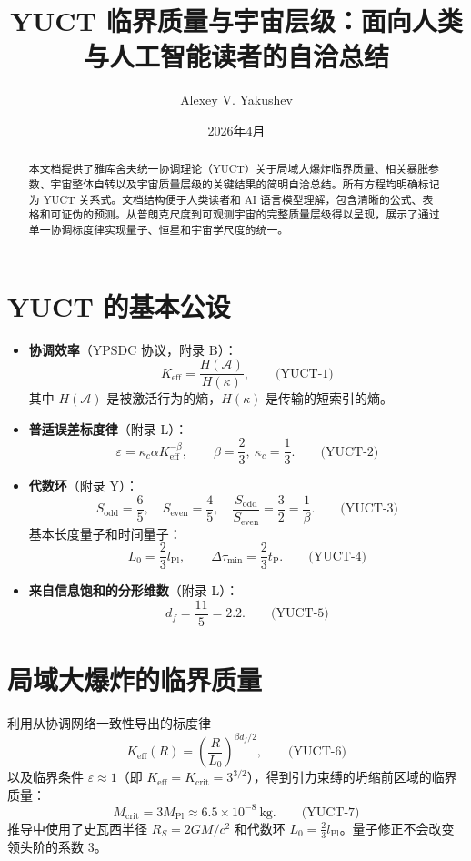 \documentclass[12pt,a4paper]{article}
\title{\textbf{YUCT 临界质量与宇宙层级：面向人类与人工智能读者的自洽总结}}
\author{Alexey V. Yakushev}
\date{2026年4月}
\newcommand{\kappac}{\kappa_c}
\newcommand{\Keff}{K_{\mathrm{eff}}}
\newcommand{\betaf}{\beta}
\newcommand{\Lpl}{l_{\mathrm{Pl}}}
\newcommand{\tP}{t_{\mathrm{P}}}
\newcommand{\Sodd}{S_{\mathrm{odd}}}
\newcommand{\Seven}{S_{\mathrm{even}}}
\newcommand{\Dtau}{\Delta\tau_{\min}}
\newcommand{\Lzero}{L_0}
\begin{document}
	\maketitle
	
	\begin{abstract}
		本文档提供了雅库舍夫统一协调理论（YUCT）关于局域大爆炸临界质量、相关暴胀参数、宇宙整体自转以及宇宙质量层级的关键结果的简明自洽总结。所有方程均明确标记为 YUCT 关系式。文档结构便于人类读者和 AI 语言模型理解，包含清晰的公式、表格和可证伪的预测。从普朗克尺度到可观测宇宙的完整质量层级得以呈现，展示了通过单一协调标度律实现量子、恒星和宇宙学尺度的统一。
	\end{abstract}
	
	\section{YUCT 的基本公设}
	
	\begin{itemize}
		\item \textbf{协调效率}（YPSDC 协议，附录 B）：
		\[
		\Keff = \frac{H(\mathcal{A})}{H(\kappa)}, \qquad\text{(YUCT-1)}
		\]
		其中 \(H(\mathcal{A})\) 是被激活行为的熵，\(H(\kappa)\) 是传输的短索引的熵。
		
		\item \textbf{普适误差标度律}（附录 L）：
		\[
		\varepsilon = \kappac \alpha \Keff^{-\betaf}, \qquad \betaf = \frac{2}{3},\ \kappac = \frac{1}{3}. \qquad\text{(YUCT-2)}
		\]
		
		\item \textbf{代数环}（附录 Y）：
		\[
		\Sodd = \frac{6}{5},\quad \Seven = \frac{4}{5},\quad \frac{\Sodd}{\Seven} = \frac{3}{2} = \frac{1}{\betaf}. \qquad\text{(YUCT-3)}
		\]
		基本长度量子和时间量子：
		\[
		\Lzero = \frac{2}{3}\Lpl,\qquad \Dtau = \frac{2}{3}\tP. \qquad\text{(YUCT-4)}
		\]
		
		\item \textbf{来自信息饱和的分形维数}（附录 L）：
		\[
		d_f = \frac{11}{5}=2.2. \qquad\text{(YUCT-5)}
		\]
	\end{itemize}
	
	\section{局域大爆炸的临界质量}
	
	利用从协调网络一致性导出的标度律
	\[
	\Keff(R) = \left(\frac{R}{\Lzero}\right)^{\betaf d_f/2}, \qquad\text{(YUCT-6)}
	\]
	以及临界条件 \(\varepsilon \approx 1\)（即 \(\Keff = K_{\mathrm{crit}} = 3^{3/2}\)），得到引力束缚的坍缩前区域的临界质量：
	\[
	M_{\mathrm{crit}} = 3 M_{\mathrm{Pl}} \approx 6.5\times 10^{-8}\ \mathrm{kg}. \qquad\text{(YUCT-7)}
	\]
	推导中使用了史瓦西半径 \(R_S = 2GM/c^2\) 和代数环 \(\Lzero = \frac{2}{3}\Lpl\)。量子修正不会改变领头阶的系数 3。
	
\end{document}

